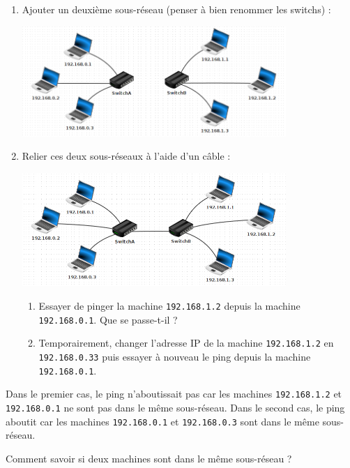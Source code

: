 \documentclass[a4paper,dvipsnames]{article}
\begin{document}
\begin{activite}[breakable]{}{}
  \begin{enumerate}
    \item Ajouter un deuxième sous-réseau (penser à bien renommer les switchs) :
      \begin{center}
	\includegraphics[width=10cm]{img/f2.png}
      \end{center}
    \item Relier ces deux sous-réseaux à l'aide d'un câble :
      \begin{center}
	\includegraphics[width=10cm]{img/f3.png}
      \end{center}
      \begin{enumerate}
	\item Essayer de \og{}pinger\fg{} la machine \texttt{192.168.1.2} depuis la machine \texttt{192.168.0.1}. Que se passe-t-il ?
	\item Temporairement, changer l'adresse IP de la machine \texttt{192.168.1.2} en \texttt{192.168.0.33} puis essayer à nouveau le ping depuis la machine \texttt{192.168.0.1}.
      \end{enumerate}
  \end{enumerate}
\end{activite}

\medskip

\begin{remarque*}[breakable]{}{}
  Dans le premier cas, le ping n'aboutissait pas car les machines \texttt{192.168.1.2} et \texttt{192.168.0.1} ne sont pas dans le même sous-réseau. Dans le second cas, le ping aboutit car les machines \texttt{192.168.0.1} et \texttt{192.168.0.3} sont dans le même sous-réseau.

  \medskip

  Comment savoir si deux machines sont dans le même sous-réseau ?
\end{remarque*}
\end{document}
